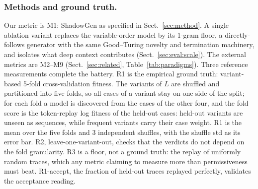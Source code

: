 \documentclass[runningheads]{llncs}
\begin{document}
\subsubsection{Methods and ground truth.}
Our metric is M1: ShadowGen as specified in Sect.~\ref{sec:method}. A single ablation variant replaces the variable-order model by its 1-gram floor, a directly-follows generator with the same Good--Turing novelty and termination machinery, and isolates what deep context contributes (Sect.~\ref{sec:eval:scale}). The external metrics are M2--M9 (Sect.~\ref{sec:related}, Table~\ref{tab:paradigms}). Three reference measurements complete the battery. R1 is the empirical ground truth: variant-based 5-fold cross-validation fitness. The variants of $L$ are shuffled and partitioned into five folds, so all cases of a variant stay on one side of the split; for each fold a model is discovered from the cases of the other four, and the fold score is the token-replay log fitness of the held-out cases: held-out variants are unseen as sequences, while frequent variants carry their case weight. R1 is the mean over the five folds and $3$ independent shuffles, with the shuffle std as its error bar. R2, leave-one-variant-out, checks that the verdicts do not depend on the fold granularity. R3 is a floor, not a ground truth: the replay of uniformly random traces, which any metric claiming to measure more than permissiveness must beat. R1-accept, the fraction of held-out traces replayed perfectly, validates the acceptance reading.
\end{document}
